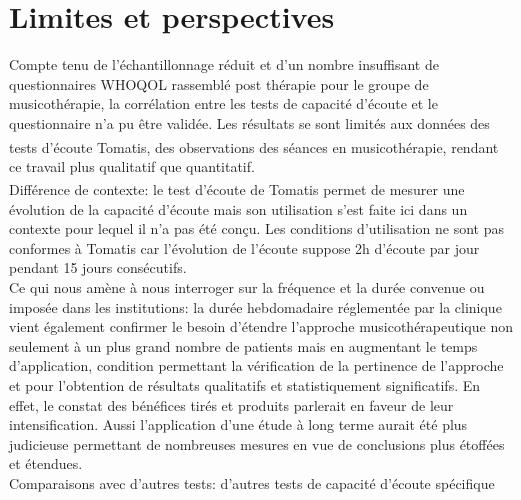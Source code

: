 


\section{Limites et perspectives}

Compte tenu  de l'échantillonnage réduit et d'un nombre insuffisant de questionnaires WHOQOL 
rassemblé post thérapie pour le groupe de musicothérapie, la corrélation entre les tests de capacité 
d'écoute et  le questionnaire n'a pu être validée.
Les résultats se sont limités aux données des 
tests d'écoute Tomatis\textsuperscript \textregistered, des observations des séances en 
musicothérapie, rendant ce travail plus qualitatif que quantitatif.
\\
Différence de contexte: le test d'écoute de Tomatis\textsuperscript \textregistered 
permet de mesurer une évolution de la capacité d'écoute mais son 
utilisation s'est faite ici dans un contexte pour lequel il n'a pas été conçu. Les conditions d'utilisation ne 
sont pas conformes à Tomatis car l'évolution de l'écoute suppose 2h d'écoute par jour pendant 15 jours 
consécutifs. 
\\
Ce qui nous amène à nous interroger sur la fréquence et la durée convenue ou imposée dans les 
institutions: 
la durée hebdomadaire réglementée par la 
clinique vient également 
confirmer le besoin d'étendre  l'approche musicothérapeutique non seulement à
un plus grand nombre de patients mais  en augmentant le temps
d'application, condition permettant la vérification de la
pertinence de l'approche et pour l'obtention de résultats qualitatifs 
et statistiquement significatifs. En effet, le constat des bénéfices
tirés et
produits parlerait en faveur de leur intensification.
Aussi  l'application d'une étude à long terme aurait été plus judicieuse permettant de 
nombreuses
mesures en vue de conclusions plus étoffées et étendues. 
\\
 Comparaisons avec d'autres tests: 	d'autres tests de capacité d'écoute spécifique 
